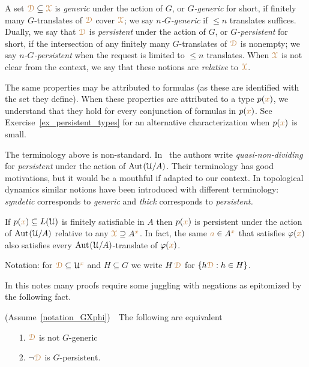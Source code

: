 A set ${\color{brown}\EuScript D}\subseteq{\color{brown}\EuScript X}$ is \emph{generic\/} under the action of $G$, or \emph{$G$-generic\/} for short, if finitely many $G$-translates of ${\color{brown}\EuScript D}$ cover ${\color{brown}\EuScript X}$; we say \emph{$n$-$G$-generic\/} if $\le n$ translates suffices.
Dually, we say that ${\color{brown}\EuScript D}$ is \emph{persistent\/} under the action of $G$, or \emph{$G$-persistent\/} for short, if the intersection of any finitely many $G$-translates of ${\color{brown}\EuScript D}$ is nonempty; we say \emph{$n$-$G$-persistent\/} when the request is limited to $\le n$ translates.
When ${\color{brown}\EuScript X}$ is not clear from the context, we say that these notions are \emph{relative\/} to ${\color{brown}\EuScript X}$.

The same properties may be attributed to formulas (as these are identified with the set they define).
When these properties are attributed to a type $p({\color{brown} x})$, we understand that they hold for every conjunction of formulas in $p({\color{brown} x})$.
See Exercise~\ref{ex_persistent_types} for an alternative characterization when $p({\color{brown} x})$ is small.

\noindent\llap{\textcolor{red}{\Large\warning}\kern1.5ex}\ignorespaces
The terminology above is non-standard.
In~\cite{CK} the authors write \textit{quasi-non-dividing\/} for \textit{persistent\/} under the action of ${\rm Aut\kern.15ex}(\EuScript U/A)$.
Their terminology has good motivations, but it would be a mouthful if adapted to our context.
In topological dynamics similar notions have been introduced with different terminology: \textit{syndetic\/} corresponds to \textit{generic\/} and \textit{thick\/} corresponds to \textit{persistent.}

\begin{example}
  If $p({\color{brown} x})\subseteq L(\EuScript U)$ is finitely satisfiable in $A$ then $p({\color{brown} x})$ is persistent under the action of ${\rm Aut\kern.15ex}(\EuScript U/A)$ relative to any ${\color{brown}\EuScript X}\supseteq A^{\color{brown} x}$.
  In fact, the same ${\color{brown} a}\in A^{\color{brown} x}$ that satisfies $\varphi({\color{brown} x})$ also satisfies every ${\rm Aut\kern.15ex}(\EuScript U/A)$-translate of $\varphi({\color{brown} x})$.
\end{example}

Notation: for ${\color{brown}\EuScript D}\subseteq\EuScript U^{\color{brown} x}$ and $H\subseteq G$ we write $H\,{\color{brown}\EuScript D}$ for $\{h{\color{brown}\EuScript D}: h\in H\}$.

In this notes many proofs require some juggling with negations as epitomized by the following fact.

\begin{fact}\label{fact_fip}
  (Assume~\ref{notation_GXphi})\ \  
  The following are equivalent
  \begin{itemize}
    \item[1.] ${\color{brown}\EuScript D}$ is not $G$-generic
    \item[2.] $\neg{\color{brown}\EuScript D}$ is $G$-persistent.
  \end{itemize}
\end{fact}

